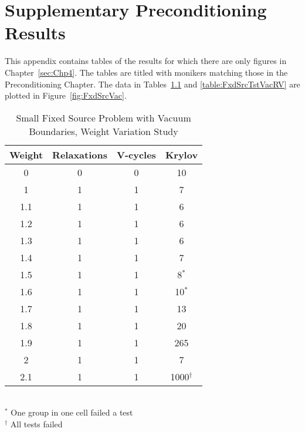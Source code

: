 
\separatorpage{}

\chapter{Supplementary Preconditioning Results}
\label{sec:AppendixD}
This appendix contains tables of the results for which there are only figures in Chapter~\ref{sec:Chp4}. The tables are titled with monikers matching those in the Preconditioning Chapter. The data in Tables~\ref{table:FxdSrcTstVacWeight} and \ref{table:FxdSrcTstVacRV} are plotted in Figure~\ref{fig:FxdSrcVac}.
\begin{table}[!h]
\caption{Small Fixed Source Problem with Vacuum Boundaries, Weight Variation Study}
\begin{center}
\begin{tabular}{| c | c | c | c |}
\hline 
Weight & Relaxations & V-cycles & Krylov \\[0.5ex]
\hline
0    & 0 & 0 & 10 \\
1    & 1 & 1 & 7 \\
1.1 & 1 & 1 & 6 \\
1.2 & 1 & 1 & 6 \\
1.3 & 1 & 1 & 6 \\
1.4 & 1 & 1 & 7 \\
1.5 & 1 & 1 & 8$^{*}$ \\
1.6 & 1 & 1 & 10$^{*}$ \\
1.7 & 1 & 1 & 13 \\
1.8 & 1 & 1 & 20 \\
1.9 & 1 & 1 & 265 \\
2    & 1 & 1 & 7 \\
2.1 & 1 & 1 & 1000$^{\dagger}$ \\
\hline 
\end{tabular} \\
$^{*}$ One group in one cell failed a test \\
$^{\dagger}$ All tests failed
\end{center}
\label{table:FxdSrcTstVacWeight}
\end{table}

